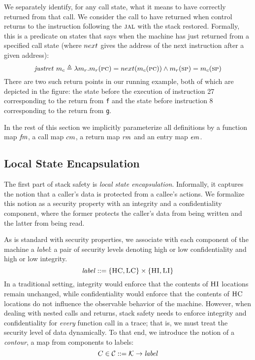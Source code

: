 \documentclass[acmsmall,review,anonymous]{acmart}\settopmatter{printfolios=true,printccs=false,printacmref=false}
\begin{document}
{We separately identify, for any call state, what it means to have
correctly returned from that call. We consider the call to have
returned when control returns to the instruction following
the $\textsc{jal}$ with the stack restored. Formally, this is a predicate on
states that says when the machine has just returned from a specified call state
(where $next$ gives the address of the next instruction after a given address):
\[%
    \ret{\mach_c} \triangleq  \lambda \mach_r . \mach_r(\PCname) =
    \nextPC(\mach_c(\PCname)) \land  \mach_r(\SP) = \mach_c(\SP)
\]
There are two such return points in our running example, both of which
are depicted in the figure: the state before the execution of
instruction 27 corresponding to the return from {\tt f} and the state
before instruction 8 corresponding to the return from {\tt g}.

\medskip

In the rest of this section we implicitly parameterize all
definitions by a function map $\mathit{fm}$, a call map $cm$, a return
map $\mathit{rm}$ and an entry map $\mathit{em}$.

\subsection{Local State Encapsulation}
\label{sec:lse}

The first part of stack safety is {\em local state encapsulation}.
Informally, it captures the notion that a caller's data is
protected from a callee's actions. We formalize this notion
as a security property with an integrity and a confidentiality
component, where the former protects the caller's data from being
written and the latter from being read.

As is standard with security properties, we associate with each
component of the machine a {\em label}: a pair of security levels
denoting high or low confidentiality and high or low integrity.
%
\[\mathit{label} ::= \{\textsc{HC},\textsc{LC}\} \times \{\textsc{HI},\textsc{LI}\}\]
%
In a traditional setting, integrity would enforce that the contents of
$\textsc{HI}$ locations remain unchanged, while confidentiality would
enforce that the contents of $\textsc{HC}$ locations do not influence the
observable behavior of the machine. However, when dealing with nested
calls and returns, stack safety needs to enforce integrity and
confidentiality for {\em every} function call in a trace; that is, we
must treat the security level of data dynamically.
%
To that end, we introduce the notion of a {\em contour}, a map from
components to labels:
%
\[C \in {\mathcal C} ::= {\mathcal K} \rightarrow \mathit{label}\]

}
\end{document}
